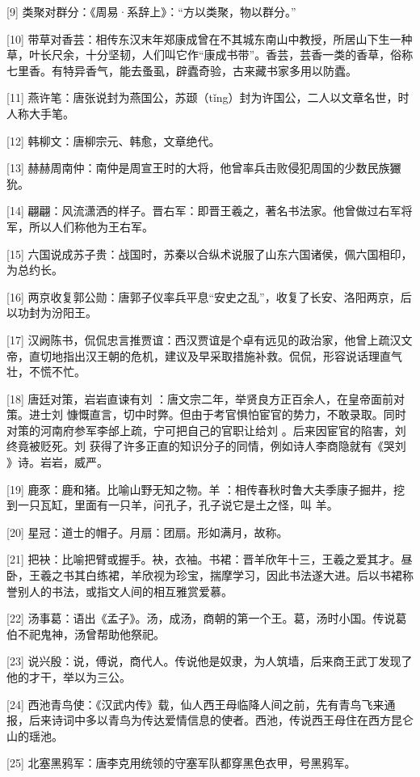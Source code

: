 \documentclass[12pt,UTF8]{ctexbook}
\begin{document}
[9] 类聚对群分：《周易·系辞上》：“方以类聚，物以群分。”

[10] 带草对香芸：相传东汉末年郑康成曾在不其城东南山中教授，所居山下生一种草，叶长尺余，十分坚韧，人们叫它作“康成书带”。香芸，芸香一类的香草，俗称七里香。有特异香气，能去蚤虱，辟蠹奇验，古来藏书家多用以防蠹。

[11] 燕许笔：唐张说封为燕国公，苏颋（tǐng）封为许国公，二人以文章名世，时人称大手笔。

[12] 韩柳文：唐柳宗元、韩愈，文章绝代。

[13] 赫赫周南仲：南仲是周宣王时的大将，他曾率兵击败侵犯周国的少数民族玁狁。

[14] 翩翩：风流潇洒的样子。晋右军：即晋王羲之，著名书法家。他曾做过右军将军，所以人们称他为王右军。

[15] 六国说成苏子贵：战国时，苏秦以合纵术说服了山东六国诸侯，佩六国相印，为总约长。

[16] 两京收复郭公勋：唐郭子仪率兵平息“安史之乱”，收复了长安、洛阳两京，后以功封为汾阳王。

[17] 汉阙陈书，侃侃忠言推贾谊：西汉贾谊是个卓有远见的政治家，他曾上疏汉文帝，直切地指出汉王朝的危机，建议及早采取措施补救。侃侃，形容说话理直气壮，不慌不忙。

[18] 唐廷对策，岩岩直谏有刘 ：唐文宗二年，举贤良方正百余人，在皇帝面前对策。进士刘 慷慨直言，切中时弊。但由于考官惧怕宦官的势力，不敢录取。同时对策的河南府参军李邰上疏，宁可把自己的官职让给刘 。后来因宦官的陷害，刘 终竟被贬死。刘 获得了许多正直的知识分子的同情，例如诗人李商隐就有《哭刘 》诗。岩岩，威严。

[19] 鹿豕：鹿和猪。比喻山野无知之物。羊 ：相传春秋时鲁大夫季康子掘井，挖到一只瓦缸，里面有一只羊，问孔子，孔子说它是土之怪，叫 羊。

[20] 星冠：道士的帽子。月扇：团扇。形如满月，故称。

[21] 把袂：比喻把臂或握手。袂，衣袖。书裙：晋羊欣年十三，王羲之爱其才。昼卧，王羲之书其白练裙，羊欣视为珍宝，揣摩学习，因此书法遂大进。后以书裙称誉别人的书法，或指文人间的相互雅赏爱慕。

[22] 汤事葛：语出《孟子》。汤，成汤，商朝的第一个王。葛，汤时小国。传说葛伯不祀鬼神，汤曾帮助他祭祀。

[23] 说兴殷：说，傅说，商代人。传说他是奴隶，为人筑墙，后来商王武丁发现了他的才干，举以为三公。

[24] 西池青鸟使：《汉武内传》载，仙人西王母临降人间之前，先有青鸟飞来通报，后来诗词中多以青鸟为传达爱情信息的使者。西池，传说西王母住在西方昆仑山的瑶池。

[25] 北塞黑鸦军：唐李克用统领的守塞军队都穿黑色衣甲，号黑鸦军。
\end{document}
